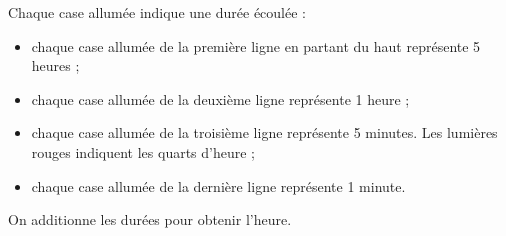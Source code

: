 \begin{corrige}
    {\red
    Chaque case allumée indique une durée écoulée :
    \begin{itemize}
       \item chaque case allumée de la première ligne en partant du haut représente 5 heures ;     
       \item chaque case allumée de la deuxième ligne représente 1 heure ;
       \item chaque case allumée de la troisième ligne représente 5 minutes. Les lumières rouges indiquent les quarts d’heure ;
       \item chaque case allumée de la dernière ligne représente 1 minute.
    \end{itemize}
   On additionne les durées pour obtenir l'heure.
    }
 \end{corrige}